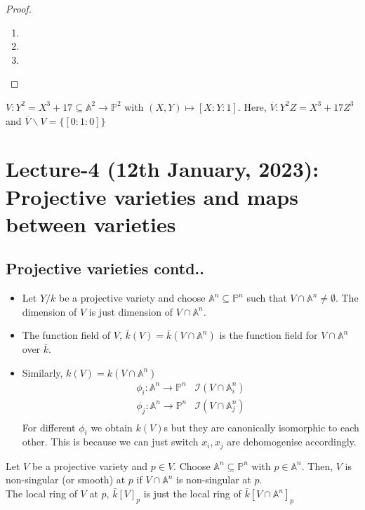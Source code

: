 \documentclass[oneside, 12pt, ]{scrbook}
\newcommand{\I}{\mathcal{I}}
\newcommand{\Aa}{\mathbb{A}}
\newcommand{\PP}{\mathbb{P}}
\theoremstyle{theorem}
\begin{document}
\begin{proof}
\begin{enumerate}
\item 

\item

\item
\end{enumerate}
\end{proof}

\begin{example}
$V : Y^2 = X^3 + 17 \subseteq \mathbb{A}^2 \rightarrow \mathbb{P}^2$ with $(X,Y) \mapsto [X: Y: 1]$. Here, $\overline{V} : Y^2Z =X^3 +17Z^3$ and $\overline{V} \backslash V = \{[0:1:0]\}$
\end{example}

\chapter{Lecture-4 (12th January, 2023): Projective varieties and maps between varieties}

\section{Projective varieties contd..}

\begin{definition}
\begin{itemize}
\item Let $Y / k$ be a projective variety and choose $\Aa^n \subseteq \PP^n$ such that $V \cap \Aa^n \neq \emptyset$. The dimension of $V$ is just dimension of $V \cap \Aa^n$.
\item The function field of $V$, $\bar{k}(V) = \bar{k}(V \cap \Aa^n)$ is the function field for $V \cap \Aa^n$ over $\bar{k}$.
\item Similarly, $k(V) = k(V \cap \Aa^n)$
\begin{align*}
\phi_{i}: \Aa^n \rightarrow \PP^n &\I(V \cap \Aa_{i}^n) \\
\phi_{j}: \Aa^n \rightarrow \PP^n &\I(V \cap \Aa_{j}^n) \\ 
\end{align*}
For different $\phi_{i}$ we obtain $k(V)$s but they are canonically isomorphic to each other. This is because we can just switch $x_{i},x_{j}$ are dehomogenise accordingly. 
\end{itemize}
\end{definition}

\begin{definition}
Let $V$ be a projective variety and $p \in V$. Choose $\Aa^n \subseteq \PP^n$ with $p \in \Aa^n$. Then, $V$ is non-singular (or smooth) at $p$ if $V\cap \Aa^n$ is non-singular at $p$. \\

The local ring of $V$ at $p$, $\bar{k}[V]_{p}$ is just the local ring of $\bar{k}[V \cap \Aa^n]_{p}$
\end{definition}
\end{document}
